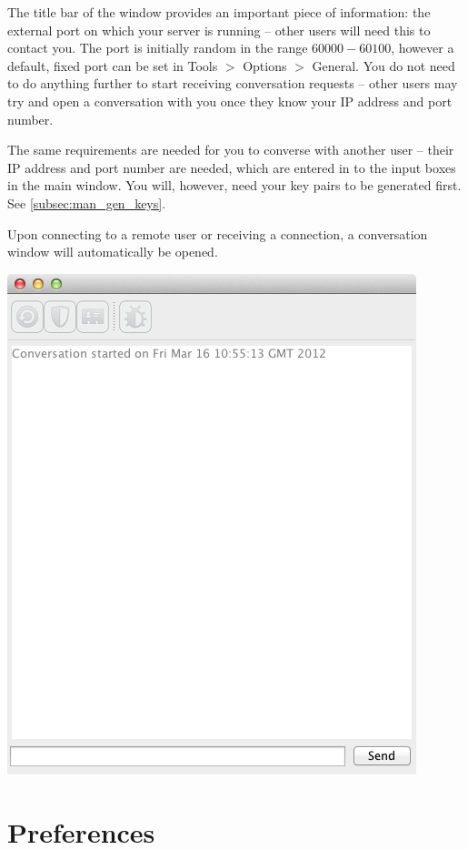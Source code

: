 The title bar of the window provides an important piece of information: the external port on which your server is running -- other users will need this to contact you. The port is initially random in the range $60000-60100$, however a default, fixed port can be set in Tools $>$ Options $>$ General. You do not need to do anything further to start receiving conversation requests -- other users may try and open a conversation with you once they know your IP address and port number.

The same requirements are needed for you to converse with another user -- their IP address and port number are needed, which are entered in to the input boxes in the main window. You will, however, need your key pairs to be generated first. See \textsection\ref{subsec:man_gen_keys}.

Upon connecting to a remote user or receiving a connection, a conversation window will automatically be opened.

\begin{center}
  \includegraphics[scale=0.6]{./Figures/AppD/D-3b.png}
\end{center}

\section{Preferences}

